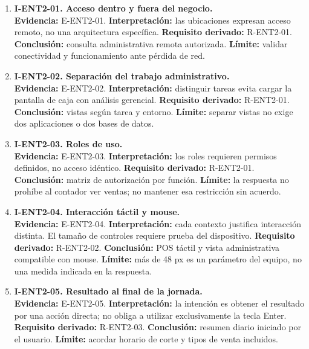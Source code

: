 {\small
\begin{enumerate}
  \item \textbf{I-ENT2-01. Acceso dentro y fuera del negocio.}\\
  \textbf{Evidencia:} E-ENT2-01. \textbf{Interpretación:} las ubicaciones
  expresan acceso remoto, no una arquitectura específica.
  \textbf{Requisito derivado:} R-ENT2-01. \textbf{Conclusión:} consulta
  administrativa remota autorizada. \textbf{Límite:} validar conectividad y
  funcionamiento ante pérdida de red.

  \item \textbf{I-ENT2-02. Separación del trabajo administrativo.}\\
  \textbf{Evidencia:} E-ENT2-02. \textbf{Interpretación:} distinguir tareas
  evita cargar la pantalla de caja con análisis gerencial.
  \textbf{Requisito derivado:} R-ENT2-01. \textbf{Conclusión:} vistas según
  tarea y entorno. \textbf{Límite:} separar vistas no exige dos aplicaciones
  o dos bases de datos.

  \item \textbf{I-ENT2-03. Roles de uso.}\\
  \textbf{Evidencia:} E-ENT2-03. \textbf{Interpretación:} los roles
  requieren permisos definidos, no acceso idéntico. \textbf{Requisito
  derivado:} R-ENT2-01. \textbf{Conclusión:} matriz de autorización por
  función. \textbf{Límite:} la respuesta no prohíbe al contador ver ventas;
  no mantener esa restricción sin acuerdo.

  \item \textbf{I-ENT2-04. Interacción táctil y mouse.}\\
  \textbf{Evidencia:} E-ENT2-04. \textbf{Interpretación:} cada contexto
  justifica interacción distinta. El tamaño de controles requiere prueba del
  dispositivo. \textbf{Requisito derivado:} R-ENT2-02. \textbf{Conclusión:}
  POS táctil y vista administrativa compatible con mouse. \textbf{Límite:}
  más de 48 px es un parámetro del equipo, no una medida indicada en la
  respuesta.

  \item \textbf{I-ENT2-05. Resultado al final de la jornada.}\\
  \textbf{Evidencia:} E-ENT2-05. \textbf{Interpretación:} la intención es
  obtener el resultado por una acción directa; no obliga a utilizar
  exclusivamente la tecla Enter. \textbf{Requisito derivado:} R-ENT2-03.
  \textbf{Conclusión:} resumen diario iniciado por el usuario.
  \textbf{Límite:} acordar horario de corte y tipos de venta incluidos.


\end{enumerate}}
